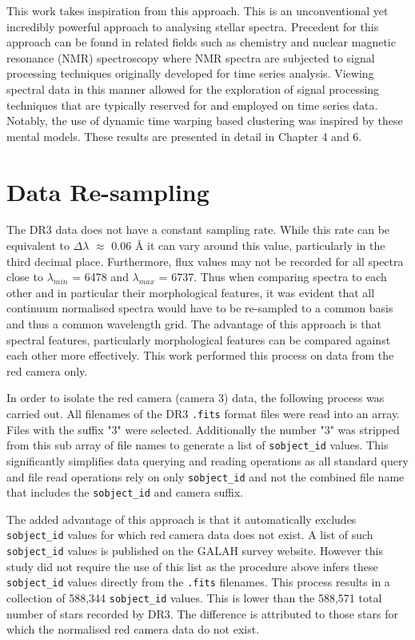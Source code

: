 This work takes inspiration from this approach. This is an unconventional yet incredibly powerful approach to analysing stellar spectra. Precedent for this approach can be found in related fields such as chemistry and nuclear magnetic resonance (NMR) spectroscopy where NMR spectra are subjected to signal processing techniques originally developed for time series analysis\cite{nielsen2019practical}. Viewing spectral data in this manner allowed for the exploration of signal processing techniques that are typically reserved for and employed on time series data. Notably, the use of dynamic time warping based clustering was inspired by these mental models. These results are presented in detail in Chapter 4 and 6.

\section{Data Re-sampling}

The DR3 data does not have a constant sampling rate. While this rate can be equivalent to $\Delta\lambda$ $\approx$ 0.06 \r{A}\cite{vcotar2021galah} it can vary around this value, particularly in the third decimal place. Furthermore, flux values may not be recorded for all spectra close to $\lambda_{min}$ = 6478 and $\lambda_{max}$ = 6737. Thus when comparing spectra to each other and in particular their morphological features, it was evident that all continuum normalised spectra would have to be re-sampled to a common basis and thus a common wavelength grid. The advantage of this approach is that spectral features, particularly morphological features can be compared against each other more effectively. This work performed this process on data from the red camera only. 

In order to isolate the red camera (camera 3) data, the following process was carried out. All filenames of the DR3 \texttt{.fits} format files were read into an array. Files with the suffix "3" were selected. Additionally the number "3" was stripped from this sub array of file names to generate a list of \texttt{sobject\_id} values. This significantly simplifies data querying and reading operations as all standard query and file read operations rely on only \texttt{sobject\_id} and not the combined file name that includes the \texttt{sobject\_id} and camera suffix. 

The added advantage of this approach is that it automatically excludes \texttt{sobject\_id} values for which red camera data does not exist. A list of such \texttt{sobject\_id} values is published on the GALAH survey website. However this study did not require the use of this list as the procedure above infers these \texttt{sobject\_id} values directly from the \texttt{.fits} filenames. This process results in a collection of 588,344 \texttt{sobject\_id} values. This is lower than the 588,571 total number of stars recorded by DR3. The difference is attributed to those stars for which the normalised red camera data do not exist. 

